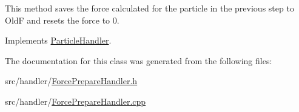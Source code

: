This method saves the force calculated for the particle in the previous step to Old\-F and resets the force to 0. 



Implements \hyperlink{classParticleHandler_a95783831b8077d447c95ec5e2627c1fa}{Particle\-Handler}.



The documentation for this class was generated from the following files\-:\begin{DoxyCompactItemize}
\item 
src/handler/\hyperlink{ForcePrepareHandler_8h}{Force\-Prepare\-Handler.\-h}\item 
src/handler/\hyperlink{ForcePrepareHandler_8cpp}{Force\-Prepare\-Handler.\-cpp}\end{DoxyCompactItemize}
